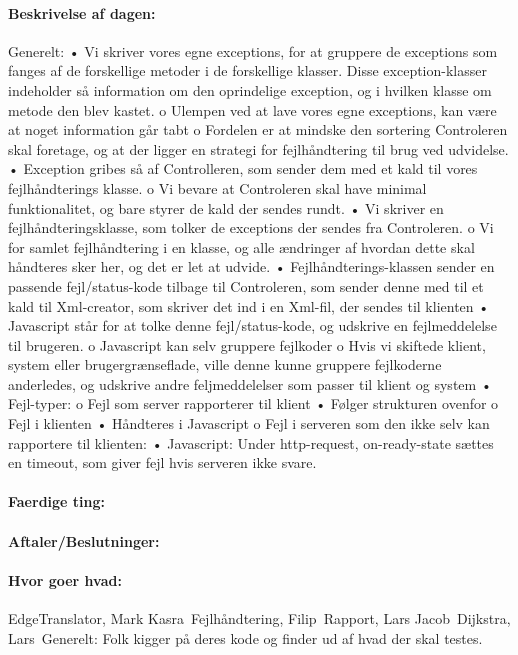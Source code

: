 \documentclass[a4paper,10pt,titlepage]{article}
\begin{document}
		\paragraph{Beskrivelse af dagen:}
		
		Generelt:
•	Vi skriver vores egne exceptions, for at gruppere de exceptions som fanges af de forskellige metoder i de forskellige klasser. Disse exception-klasser indeholder så information om den oprindelige exception, og i hvilken klasse om metode den blev kastet. 
o	Ulempen ved at lave vores egne exceptions, kan være at noget information går tabt
o	Fordelen er at mindske den sortering Controleren skal foretage, og at der ligger en strategi for fejlhåndtering til brug ved udvidelse.
•	Exception gribes så af Controlleren, som sender dem med et kald til vores fejlhåndterings klasse.
o	Vi bevare at Controleren skal have minimal funktionalitet, og bare styrer de kald der sendes rundt.
•	Vi skriver en fejlhåndteringsklasse, som tolker de exceptions der sendes fra Controleren.
o	Vi for samlet fejlhåndtering i en klasse, og alle ændringer af hvordan dette skal håndteres sker her, og det er let at udvide.
•	Fejlhåndterings-klassen sender en passende fejl/status-kode tilbage til Controleren, som sender denne med til et kald til Xml-creator, som skriver det ind i en Xml-fil, der sendes til klienten
•	Javascript står for at tolke denne fejl/status-kode, og udskrive en fejlmeddelelse til brugeren.
o	Javascript kan selv gruppere fejlkoder
o	Hvis vi skiftede klient, system eller brugergrænseflade, ville denne kunne gruppere fejlkoderne anderledes, og udskrive andre feljmeddelelser som passer til klient og system 
•	Fejl-typer:
o	Fejl som server rapporterer til klient
•	Følger strukturen ovenfor
o	Fejl i klienten	
•	Håndteres i Javascript
o	Fejl i serveren som den ikke selv kan rapportere til klienten:
•	Javascript: Under http-request, on-ready-state sættes en timeout, som giver fejl hvis serveren ikke svare.

		\paragraph{Faerdige ting:}
		
		\paragraph{Aftaler/Beslutninger:}
		
		\paragraph{Hvor goer hvad:}
		EdgeTranslator, Mark Kasra\
Fejlhåndtering, Filip\
Rapport, Lars Jacob\
Dijkstra, Lars\
Generelt: Folk kigger på deres kode og finder ud af hvad der skal testes.
\end{document}
